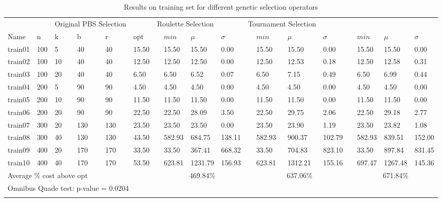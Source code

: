 \begin{table}[H]
    \caption{Results on training set for different genetic selection operators}\label{table:compare_genetic}
    \footnotesize
    \begin{tabularx}{\textwidth}{lllllllXXXlXXXlXXX}
    \firsthline
    \multicolumn{6}{c}{Instance} & \quad & \multicolumn{3}{c}{Original PBS Selection} & \quad & \multicolumn{3}{c}{Roulette Selection} & \quad & \multicolumn{3}{c}{Tournament Selection} \\
    \cline{1-6} \cline{8-10} \cline{12-14} \cline{16-18}
    Name & n & k & b & r & opt && $min$ &$\mu$ & $\sigma$ && $min$ &$\mu$ & $\sigma$ && $min$ &$\mu$ & $\sigma$\\
    \hline
    train01 & 100 & 5 & 40 & 40 & 15.50 && 15.50 & 15.50 & 0.00 && 15.50 & 15.50 & 0.00 && 15.50 & 15.50 & 0.00\\
    train02 & 100 & 10 & 40 & 40 & 12.50 && 12.50 & 12.50 & 0.00 && 12.50 & 12.53 & 0.18 && 12.50 & 12.58 & 0.31\\
    train03 & 100 & 20 & 40 & 40 & 6.50 && 6.50 & 6.52 & 0.07 && 6.50 & 7.15 & 0.49 && 6.50 & 6.99 & 0.44\\
    train04 & 200 & 5 & 90 & 90 & 4.50 && 4.50 & 4.50 & 0.00 && 4.50 & 4.50 & 0.00 && 4.50 & 4.50 & 0.00\\
    train05 & 200 & 10 & 90 & 90 & 11.50 && 11.50 & 11.50 & 0.00 && 11.50 & 11.50 & 0.00 && 11.50 & 11.50 & 0.00\\
    train06 & 200 & 20 & 90 & 90 & 22.50 && 22.50 & 28.09 & 3.50 && 22.50 & 29.75 & 2.06 && 22.50 & 29.18 & 2.77\\
    train07 & 300 & 20 & 130 & 130 & 23.50 && 23.50 & 23.50 & 0.00 && 23.50 & 23.90 & 1.19 && 23.50 & 23.82 & 1.08\\
    train08 & 300 & 40 & 130 & 130 & 43.50 && 582.93 & 684.75 & 138.11 && 582.93 & 900.37 & 102.79 && 582.93 & 839.51 & 152.00\\
    train09 & 400 & 20 & 170 & 170 & 33.50 && 33.50 & 367.41 & 668.32 && 33.50 & 704.83 & 823.10 && 33.50 & 897.84 & 831.45\\
    train10 & 400 & 40 & 170 & 170 & 53.50 && 623.81 & 1231.79 & 156.93 && 623.81 & 1312.21 & 155.16 && 697.47 & 1267.48 & 145.36\\
    \hline
    \multicolumn{6}{l}{Average \% cost above opt} && \multicolumn{3}{c}{469.84\%} && \multicolumn{3}{c}{637.06\%} && \multicolumn{3}{c}{671.84\%}\\
    \hline
    \multicolumn{6}{l}{Omnibus Quade test: p-value = 0.0204} & \multicolumn{11}{c}{}\\
    \lasthline
    \end{tabularx}
    \normalsize
\end{table}

